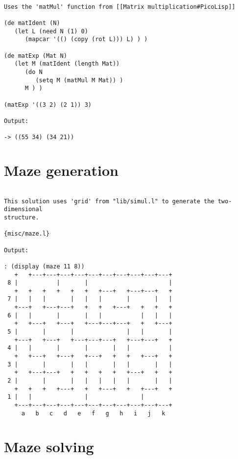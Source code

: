 \begin{verbatim}

Uses the 'matMul' function from [[Matrix multiplication#PicoLisp]]

(de matIdent (N)
   (let L (need N (1) 0)
      (mapcar '(() (copy (rot L))) L) ) )

(de matExp (Mat N)
   (let M (matIdent (length Mat))
      (do N
         (setq M (matMul M Mat)) )
      M ) )

(matExp '((3 2) (2 1)) 3)

Output:

-> ((55 34) (34 21))

\end{verbatim}

\section*{Maze generation}

\begin{verbatim}

This solution uses 'grid' from "lib/simul.l" to generate the two-dimensional
structure.

{misc/maze.l}

Output:

: (display (maze 11 8))
   +   +---+---+---+---+---+---+---+---+---+---+
 8 |           |       |                       |
   +   +   +   +   +   +   +---+   +---+---+   +
 7 |   |   |       |   |   |       |       |   |
   +---+   +---+---+   +   +   +---+   +   +   +
 6 |   |       |       |   |           |   |   |
   +   +---+   +---+   +---+---+---+   +   +---+
 5 |       |       |               |   |       |
   +---+   +---+   +---+---+---+   +---+---+   +
 4 |   |       |       |       |   |           |
   +   +---+   +---+   +---+   +   +   +---+   +
 3 |       |       |   |       |   |       |   |
   +   +---+---+   +   +   +   +   +---+   +   +
 2 |       |       |   |   |   |   |       |   |
   +   +   +   +---+   +   +---+   +   +---+   +
 1 |   |               |               |
   +---+---+---+---+---+---+---+---+---+---+---+
     a   b   c   d   e   f   g   h   i   j   k

\end{verbatim}

\section*{Maze solving}

